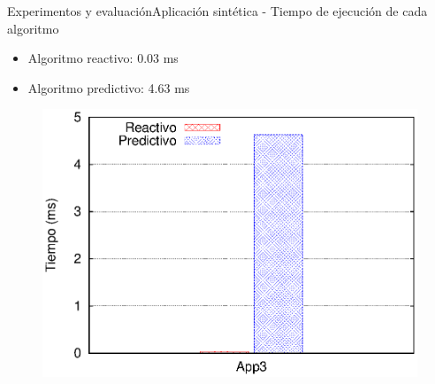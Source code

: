 \begin{frame}{Experimentos y evaluación}{Aplicación sintética - Tiempo de ejecución de cada algoritmo}
\begin{itemize}
	\item Algoritmo reactivo: 0.03 ms
	\item Algoritmo predictivo: 4.63 ms
\end{itemize}

\begin{figure}[p]
	\centering
	\includegraphics[scale=0.65]{images/exp/app3/cm/logical/tiempoAlgoritmos.eps}
\end{figure}

\end{frame}

